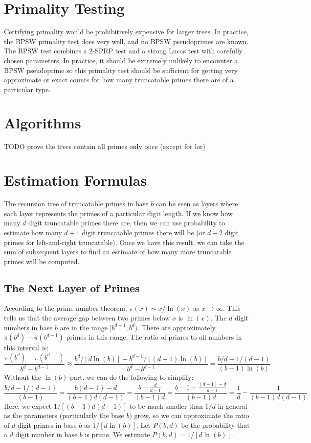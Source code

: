 \documentclass[12pt]{article}
\begin{document}
\section{Primality Testing}

Certifying primality would be prohibitively expensive for larger trees. In practice, the BPSW primality test does very well, and no BPSW pseudoprimes are known. The BPSW test combines a 2-SPRP test and a strong Lucas test with carefully chosen parameters. In practice, it should be extremely unlikely to encounter a BPSW pseudoprime so this primality test should be sufficient for getting very approximate or exact counts for how many truncatable primes there are of a particular type.

\section{Algorithms}

TODO prove the trees contain all primes only once (except for lor)

\section{Estimation Formulas}

The recursion tree of truncatable primes in base $b$ can be seen as layers where each layer represents the primes of a particular digit length. If we know how many $d$ digit truncatable primes there are, then we can use probability to estimate how many $d+1$ digit truncatable primes there will be (or $d+2$ digit primes for left-and-right truncatable). Once we have this result, we can take the sum of subsequent layers to find an estimate of how many more truncatable primes will be computed.

\subsection{The Next Layer of Primes}

According to the prime number theorem, $\pi(x)\sim x/\ln(x)$ as $x\to\infty$. This tells us that the average gap between two primes below $x$ is $\ln(x)$. The $d$ digit numbers in base $b$ are in the range $[b^{d-1},b^d)$. There are approximately $\pi(b^d)-\pi(b^{d-1})$ primes in this range. The ratio of primes to all numbers in this interval is:
\begin{equation}
\frac{\pi(b^d)-\pi(b^{d-1})}{b^d-b^{d-1}} \approx \frac{b^d/[d\ln(b)]-b^{d-1}/[(d-1)\ln(b)]}{b^d-b^{d-1}} = \frac{b/d-1/(d-1)}{(b-1)\ln(b)}
\end{equation}
Without the $\ln(b)$ part, we can do the following to simplify:
\begin{equation}
\frac{b/d-1/(d-1)}{(b-1)} = \frac{b(d-1)-d}{(b-1)d(d-1)} = \frac{b-\frac{d}{d-1}}{(b-1)d} = \frac{b-1+\frac{(d-1)-d}{d-1}}{(b-1)d} = \frac{1}{d}-\frac{1}{(b-1)d(d-1)}
\end{equation}
Here, we expect $1/[(b-1)d(d-1)]$ to be much smaller than $1/d$ in general as the parameters (particularly the base $b$) grow, so we can approximate the ratio of $d$ digit primes in base $b$ as $1/[d\ln(b)]$. Let $P(b,d)$ be the probability that a $d$ digit number in base $b$ is prime. We estimate $P(b,d)=1/[d\ln(b)]$.
\end{document}
